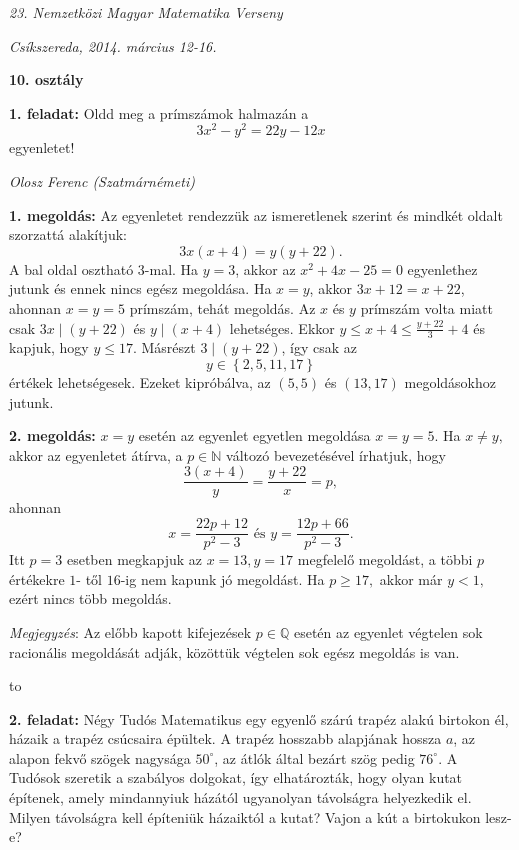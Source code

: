 \documentclass[a4paper,10pt]{article}
\newcommand{\ki}[2]{\hfill {\it #1 (#2)}\medskip}
\newcommand{\vonal}{\hbox to \hsize{\hskip2truecm\hrulefill\hskip2truecm}}
\begin{document}
\begin{center} \Large {\em 23. Nemzetközi Magyar Matematika Verseny} \end{center}
\begin{center} \large{\em Csíkszereda, 2014. március 12-16.} \end{center}
\smallskip
\begin{center} \large{\bf 10. osztály} \end{center}
\bigskip 

{\bf 1. feladat: }  Oldd meg a prímszámok halmazán a $$
3x^{2}-y^{2}=22y-12x$$ egyenletet!


\ki{Olosz Ferenc}{Szatmárnémeti}\medskip

{\bf 1. megoldás: }  Az egyenletet rendezzük az ismeretlenek szerint
és mind\-két oldalt szor\-zat\-tá alakítjuk:%
\[
3x(x+4)=y(y+22).%
\]
A bal oldal osztható $3$-mal. Ha $y=3$, akkor az $x^{2}+4x-25=0$
egyenlethez jutunk és ennek nincs egész megoldása.  Ha
$x=y$, akkor $3x+12=x+22$, ahonnan $x=y=5$ prímszám,
tehát megoldás. Az $x$ és $y$ prímszám volta
miatt csak $3x\mid(y+22)$ és $y\mid(x+4)$ lehetséges. Ekkor
$y\leq x+4\leq\frac{y+22}{3}+4$ és kapjuk, hogy $y\leq17$.
Másrészt $3\mid(y+22)$, így csak az
$$y\in\left\{ 2,5,11,17\right\}  $$ értékek lehetségesek.
Ezeket kipróbálva, az $\left( 5,5\right)$ és $\left(
13,17\right)$ meg\-oldá\-sok\-hoz jutunk.




\medskip

{\bf 2. megoldás: }  $x = y$  esetén az egyenlet egyetlen megoldása $x = y = 5.$
Ha  $x\neq y,$  akkor az egyenletet átírva, a $p\in \mathbb{N}$
változó beve\-ze\-té\-sé\-vel írhatjuk, hogy
\[\frac{{3(x + 4)}}{y} = \frac{{y + 22}}{x} = p,\] ahonnan  \[x =
\frac{{22p + 12}}{{{p^2} - 3}}  \mbox{ és } y = \frac{{12p +
66}}{{{p^2} - 3}}.\] Itt $p = 3$  esetben megkapjuk az  $x = 13, y =
17$ megfe\-le\-lő meg\-ol\-dást, a többi  $p$  értékekre  $1$-
től $16$-ig nem kapunk jó megoldást. Ha $p\geq 17,$ akkor  már
$y<1,$ ezért nincs több megoldás.

\medskip

\textit{Megjegyzés}: Az előbb kapott kifejezések $p\in \mathbb{Q}$ esetén az
egyenlet végtelen sok racionális megoldását adják, közöttük
végtelen sok egész megoldás is van.

\medskip

\vonal


{\bf 2. feladat: }  Négy Tudós Matematikus egy egyenlő szárú trapéz alakú birtokon
él, házaik a trapéz csúcsaira épültek. A trapéz hosszabb alapjának
hossza $a$, az alapon fekvő szögek nagysága $50^\circ $, az átlók
által bezárt szög pedig $76^\circ$. A Tudósok szeretik a szabályos
dolgokat, így elhatározták, hogy olyan kutat építenek, amely
mindannyiuk házától ugyanolyan távolságra helyezkedik el. Milyen
távolságra kell építeniük házaiktól a kutat? Vajon a kút a
birtokukon lesz-e?
\end{document}

